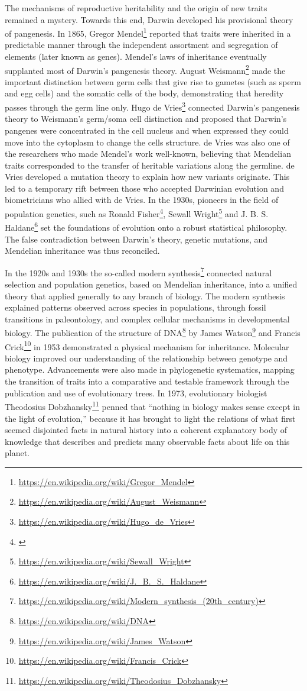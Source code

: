 \documentclass[]{book}
\let\rmarkdownfootnote\footnote%
\def\footnote{\protect\rmarkdownfootnote}
\renewcommand{\href}[2]{#2\footnote{\url{#1}}}
\theoremstyle{definition}
\theoremstyle{definition}
\theoremstyle{definition}
\theoremstyle{remark}
\begin{document}
The mechanisms of reproductive heritability and the origin of new traits
remained a mystery. Towards this end, Darwin developed his provisional
theory of pangenesis. In 1865, \href{https://en.wikipedia.org/wiki/Gregor_Mendel}{Gregor Mendel} reported that traits were
inherited in a predictable manner through the independent assortment and
segregation of elements (later known as genes). Mendel's laws of
inheritance eventually supplanted most of Darwin's pangenesis theory.
\href{https://en.wikipedia.org/wiki/August_Weismann}{August Weismann} made the important distinction between germ cells that
give rise to gametes (such as sperm and egg cells) and the somatic cells
of the body, demonstrating that heredity passes through the germ line
only. \href{https://en.wikipedia.org/wiki/Hugo_de_Vries}{Hugo de Vries} connected Darwin's pangenesis theory to Weismann's
germ/soma cell distinction and proposed that Darwin's pangenes were
concentrated in the cell nucleus and when expressed they could move into
the cytoplasm to change the cells structure. de Vries was also one of
the researchers who made Mendel's work well-known, believing that
Mendelian traits corresponded to the transfer of heritable variations
along the germline. de Vries developed a mutation theory to explain how
new variants originate. This led to a temporary rift between those who
accepted Darwinian evolution and biometricians who allied with de Vries.
In the 1930s, pioneers in the field of population genetics, such as
\href{}{Ronald Fisher}, \href{https://en.wikipedia.org/wiki/Sewall_Wright}{Sewall Wright} and \href{https://en.wikipedia.org/wiki/J._B._S._Haldane}{J. B. S. Haldane} set the foundations of
evolution onto a robust statistical philosophy. The false contradiction
between Darwin's theory, genetic mutations, and Mendelian inheritance
was thus reconciled.

In the 1920s and 1930s the so-called
\href{https://en.wikipedia.org/wiki/Modern_synthesis_(20th_century)}{modern
synthesis} connected natural selection and population genetics, based on
Mendelian inheritance, into a unified theory that applied generally to
any branch of biology. The modern synthesis explained patterns observed
across species in populations, through fossil transitions in
paleontology, and complex cellular mechanisms in developmental biology.
The publication of the structure of
\href{https://en.wikipedia.org/wiki/DNA}{DNA} by
\href{https://en.wikipedia.org/wiki/James_Watson}{James Watson} and
\href{https://en.wikipedia.org/wiki/Francis_Crick}{Francis Crick} in
1953 demonstrated a physical mechanism for inheritance. Molecular
biology improved our understanding of the relationship between genotype
and phenotype. Advancements were also made in phylogenetic systematics,
mapping the transition of traits into a comparative and testable
framework through the publication and use of evolutionary trees. In
1973, evolutionary biologist
\href{https://en.wikipedia.org/wiki/Theodosius_Dobzhansky}{Theodosius
Dobzhansky} penned that ``nothing in biology makes sense except in the
light of evolution,'' because it has brought to light the relations of
what first seemed disjointed facts in natural history into a coherent
explanatory body of knowledge that describes and predicts many
observable facts about life on this planet.
\end{document}
